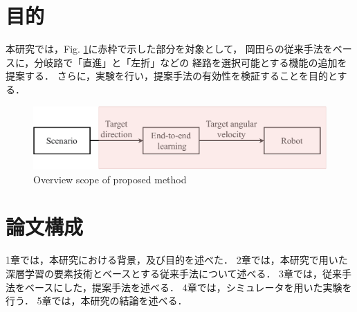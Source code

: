 \section{目的}
本研究では，Fig. \ref{fig::haikei_abs}に赤枠で示した部分を対象として，
岡田らの従来手法をベースに，分岐路で「直進」と「左折」などの
経路を選択可能とする機能の追加を提案する．
さらに，実験を行い，提案手法の有効性を検証することを目的とする．

\begin{figure}[H]
    \centering
    \includegraphics[width = 12cm]{./figs/haikei_abs.pdf}
    \caption{Overview scope of proposed method}
    \label{fig::haikei_abs}
\end{figure}



\section{論文構成}
1章では，本研究における背景，及び目的を述べた．
2章では，本研究で用いた深層学習の要素技術とベースとする従来手法について述べる．
3章では，従来手法をベースにした，提案手法を述べる．
4章では，シミュレータを用いた実験を行う．
5章では，本研究の結論を述べる．
